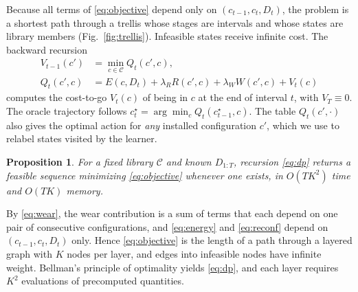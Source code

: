\documentclass[journal]{IEEEtran}
\newtheorem{proposition}{Proposition}
\begin{document}
Because all terms of \eqref{eq:objective} depend only on $(c_{t-1},c_t,D_t)$, the problem is a shortest path through a trellis whose stages are intervals and whose states are library members (Fig.~\ref{fig:trellis}). Infeasible states receive infinite cost. The backward recursion
\begin{equation}\label{eq:dp}
\begin{aligned}V_{t-1}(c')&=\min_{c\in\mathcal{C}}Q_t(c',c),\\
Q_t(c',c)&=E(c,D_t)+\lambda_R R(c',c)+\lambda_W W(c',c)+V_t(c)\end{aligned}
\end{equation}
computes the cost-to-go $V_t(c)$ of being in $c$ at the end of interval $t$, with $V_T\equiv0$. The oracle trajectory follows $c^\star_t=\arg\min_c Q_t(c^\star_{t-1},c)$. The table $Q_t(c',\cdot)$ also gives the optimal action for \emph{any} installed configuration $c'$, which we use to relabel states visited by the learner.

\begin{proposition}\label{prop:dp}
For a fixed library $\mathcal{C}$ and known $D_{1:T}$, recursion \eqref{eq:dp} returns a feasible sequence minimizing \eqref{eq:objective} whenever one exists, in $O(TK^2)$ time and $O(TK)$ memory.
\end{proposition}
\begin{IEEEproof}
By \eqref{eq:wear}, the wear contribution is a sum of terms that each depend on one pair of consecutive configurations, and \eqref{eq:energy} and \eqref{eq:reconf} depend on $(c_{t-1},c_t,D_t)$ only. Hence \eqref{eq:objective} is the length of a path through a layered graph with $K$ nodes per layer, and edges into infeasible nodes have infinite weight. Bellman's principle of optimality yields \eqref{eq:dp}, and each layer requires $K^2$ evaluations of precomputed quantities.
\end{IEEEproof}
\end{document}
